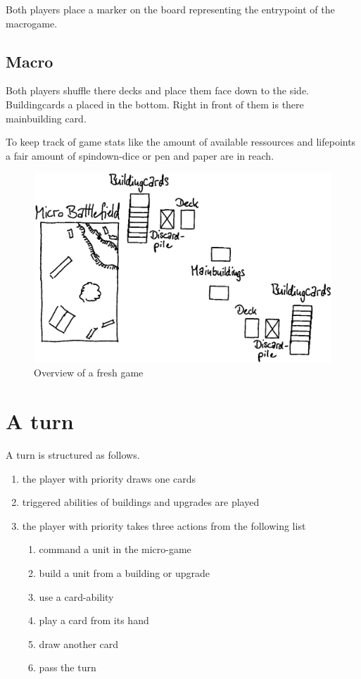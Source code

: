 \documentclass[a5paper,pagesize,10pt,bibtotoc,pointlessnumbers,
normalheadings,DIV=9,twoside=false]{scrbook}
\begin{document}
Both players place a marker on the board representing the entrypoint of the macrogame.

\subsection{Macro}
Both players shuffle there decks and place them face down to the side. Buildingcards a placed in the bottom. Right in front of them is there mainbuilding card.

To keep track of game stats like the amount of available ressources and lifepoints a fair amount of spindown-dice or pen and paper are in reach.

\begin{figure}[t]
\includegraphics[scale=0.25]{Boardoverview}
\centering
\caption{Overview of a fresh game}
\end{figure}

\section{A turn}
A turn is structured as follows.

\begin{enumerate}
\item the player with priority draws one cards
\item triggered abilities of buildings and upgrades are played
\item the player with priority takes three actions from the following list
\begin{enumerate}
\item command a unit in the micro-game
\item build a unit from a building or upgrade
\item use a card-ability
\item play a card from its hand
\item draw another card
\item pass the turn
\end{enumerate}
\end{enumerate}
\end{document}
